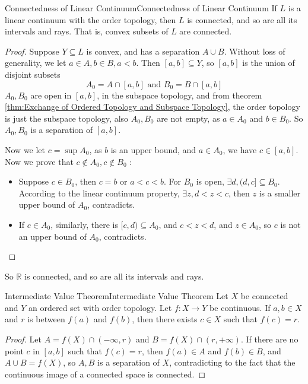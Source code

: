 \documentclass[../main.tex]{subfiles}
\begin{document}
\begin{theorem}{Connectedness of Linear Continuum}{Connectedness of Linear Continuum}
If $L$ is a linear continuum with the order topology, then $L$ is connected, and so are all its intervals and rays. That is, convex subsets of $L$ are connected.
\end{theorem}
\begin{proof}
	Suppose $Y \subseteq L$ is convex, and has a separation $A\cup B$. Without loss of generality, we let $a\in A,b\in B, a<b$. Then $[a,b] \subseteq Y$, so $[a,b]$ is the union of disjoint subsets
	\begin{equation*}
		A_0 = A\cap [a,b] \text{ and } B_0 = B\cap [a,b]
	\end{equation*}
	$A_0,B_0$ are open in $[a,b]$, in the subspace topology, and from theorem \ref{thm:Exchange of Ordered Topology and Subspace Topology}, the order topology is just the subspace topology, also $A_0,B_0$ are not empty, as $a\in A_0$ and $b\in B_0$. So $A_0,B_0$ is a separation of $[a,b]$.

	Now we let $c = \sup A_0$, as $b$ is an upper bound, and $a\in A_0$, we have $c\in [a,b]$. Now we prove that $c\notin A_0,c\notin B_0$ :
	\begin{itemize}
		\item Suppose $c\in B_0$, then $c=b$ or $a<c<b$. For $B_0$ is open, $\exists d, (d,c] \subseteq B_0$. According to the linear continuum property,  $\exists z,d<z<c$, then $z$ is a smaller upper bound of $A_0$, contradicts.
		\item If $c\in A_0$, similarly, there is $[c,d) \subseteq A_0$, and $c<z<d$, and $z\in A_0$, so $c$ is not an upper bound of $A_0$, contradicts.
	\end{itemize}
\end{proof}

So $\mathbb{R}$ is connected, and so are all its intervals and rays.

\begin{theorem}{Intermediate Value Theorem}{Intermediate Value Theorem}
	Let $X$ be connected and $Y$ an ordered set with order topology. Let $f:X \rightarrow Y$ be continuous. If $a,b\in X$ and $r$ is between $f(a)$ and $f(b)$, then there exists $c\in X$ such that $f(c) = r$.
\end{theorem}

\begin{proof}
	Let $A = f(X)\cap (-\infty ,r)$ and $B = f(X)\cap (r,+\infty )$. If there are no point $c$ in $[a,b]$ such that $f(c) = r$, then $f(a)\in A$ and $f(b)\in B$, and $A\cup B = f(X)$, so $A,B$ is a separation of $X$, contradicting to the fact that the continuous image of a connected space is connected.
\end{proof}
\end{document}
